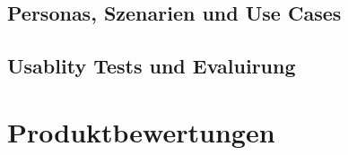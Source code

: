 


\subsection{Personas, Szenarien und Use Cases}




\subsection{Usablity Tests und Evaluirung}

\section{Produktbewertungen}



